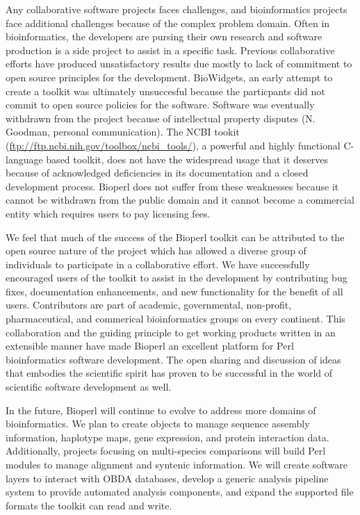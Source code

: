 \documentclass[12pt]{article}
\begin{document}
Any collaborative software projects faces challenges, and
bioinformatics projects face additional challenges because of the complex
problem domain.  Often in bioinformatics, the developers are pursing
their own research and software production is a side project to assist
in a specific task.  Previous collaborative efforts have produced
unsatisfactory results due mostly to lack of commitment to open source
principles for the development.  BioWidgets, an early attempt to
create a toolkit was ultimately unsuccesful because the particpants did
not commit to open source policies for the software.  Software was
eventually withdrawn from the project because of intellectual property
disputes (N. Goodman, personal communication).  The NCBI tookit
(\url{ftp://ftp.ncbi.nih.gov/toolbox/ncbi_tools/}), a powerful and highly functional C-language based
toolkit, does not have the widespread usage that it deserves
because of acknowledged deficiencies in its documentation and a closed
development process.  Bioperl does not suffer from these weaknesses
because it cannot be withdrawn from the public domain and it cannot
become a commercial entity which requires users to pay licensing
fees.

We feel that much of the success of the Bioperl toolkit can be
attributed to the open source nature of the project which has allowed
a diverse group of individuals to participate in a collaborative effort.
We have successfully encouraged users of the toolkit to assist in the
development by contributing bug fixes, documentation enhancements, and
new functionality for the benefit of all users.  Contributors are part
of academic, governmental, non-profit, pharmaceutical, and
commerical bioinformatics groups on every continent.  This collaboration and
the guiding principle to get working products written in an extensible
manner have made Bioperl an excellent platform for Perl bioinformatics
software development.  The open sharing and discussion of ideas that
embodies the scientific spirit has proven to be successful in the
world of scientific software development as well.

In the future, Bioperl will continue to evolve to address more domains
of bioinformatics.  We plan to create objects to manage sequence
assembly information, haplotype maps, gene expression, and protein
interaction data.  Additionally, projects focusing on multi-species
comparisons will build Perl modules to manage alignment and syntenic
information.  We will create software layers to interact with OBDA
databases, develop a generic analysis pipeline system to provide
automated analysis components, and expand the supported file formats
the toolkit can read and write.
\end{document}

